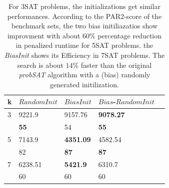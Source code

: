 \documentclass[12pt,a4paper,twoside]{scrartcl}
\numberwithin{equation}{section}
\begin{document}
\begin{table}[H]
\label{tab:com}
\begin{center}
    \begin{tabular}{|l|l|l|l|p{1cm}|}
\hline 
    k &$RandomInit$&$BiasInit$&$Bias$-$RandomInit$ \\ \hline
	3&9221.9 &9157.76 &\textbf{9078.27} \\ 
	&\textbf{55} &54 & \textbf{55} \\ \hline
	5&7143.9&\textbf{4351.09}&4582.54\\ 
	&82 &\textbf{87} &\textbf{87}\\ \hline
	7&6238.51&\textbf{5421.9}& 6310.7\\
	&60 & 60 & 60 \\ \hline
	
\end{tabular}
\caption{For 3SAT problems, the initializations get similar performances. According to the PAR2-score of the benchmark sets, the two bias initiliazatios show improvment with about $60\%$ percentage reduction in penalized runtime for 5SAT problems.  the \emph{BiasInit} shows its Efficiency in 7SAT problems. The search is about $14\%$ faster than the original \emph{probSAT} algorithm with a (bias) randomly generated initilization. }
\end{center}
\end{table} 
\clearpage
\end{document}
